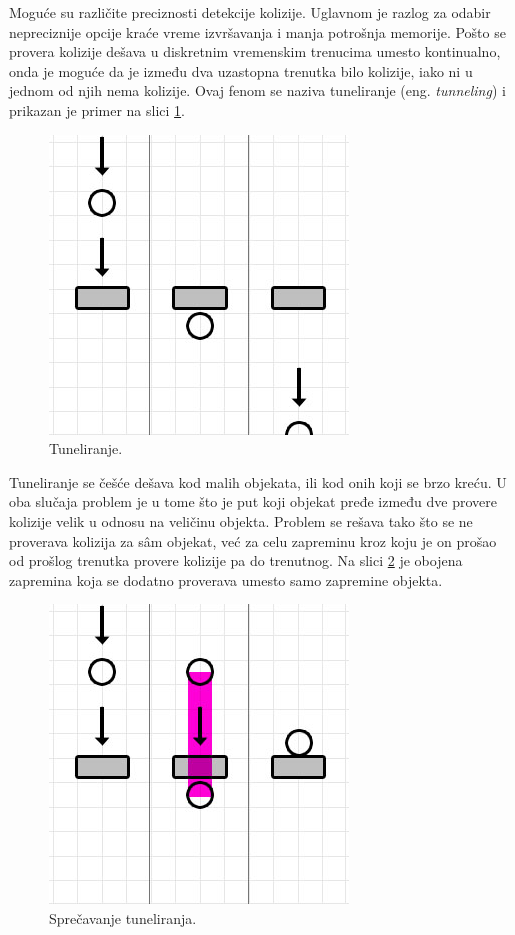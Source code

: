 \documentclass[12pt,oneside]{memoir}
\begin{document}
Moguće su različite preciznosti detekcije kolizije. 
Uglavnom je razlog za odabir nepreciznije opcije kraće vreme izvršavanja i manja potrošnja memorije.
Pošto se provera kolizije dešava u diskretnim vremenskim trenucima umesto kontinualno, onda je moguće da 
je između dva uzastopna trenutka bilo kolizije, iako ni u jednom od njih nema kolizije. 
Ovaj fenom se naziva tuneliranje (eng. {\em tunneling}) i prikazan je primer na slici \ref{fig:tunnel}. 

\begin{figure}[h!]
	\begin{center}
	\includegraphics[scale=0.55]{tunnel.png}
	\end{center}
	\caption{Tuneliranje.}
	\label{fig:tunnel}
\end{figure}

Tuneliranje se češće dešava kod malih objekata, ili kod onih koji se brzo kreću.
U oba slučaja problem je u tome što je put koji objekat pređe između dve provere kolizije velik u odnosu na veličinu objekta. 
Problem se rešava tako što se ne proverava kolizija za sâm objekat, već za celu zapreminu kroz koju je on prošao 
od prošlog trenutka provere kolizije pa do trenutnog. Na slici \ref{fig:tunnel_fix} je obojena zapremina 
koja se dodatno proverava umesto samo zapremine objekta. 

\begin{figure}[h!]
	\begin{center}
	\includegraphics[scale=0.55]{tunnel_fixed.png}
	\end{center}
	\caption{Sprečavanje tuneliranja.}
	\label{fig:tunnel_fix}
\end{figure}
\end{document}
